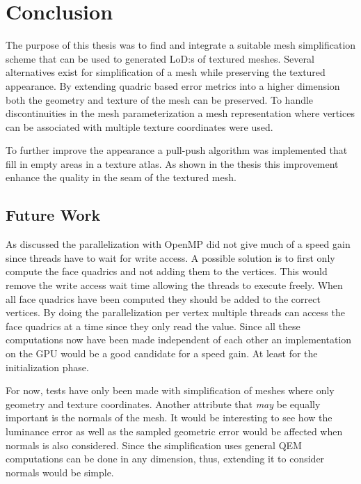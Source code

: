 \chapter{Conclusion} \label{cha:conclusion}

The purpose of this thesis was to find and integrate a suitable mesh simplification scheme that can be used to generated LoD:s of textured meshes. Several alternatives exist for simplification of a mesh while preserving the textured appearance. By extending quadric based error metrics into a higher dimension both the geometry and texture of the mesh can be preserved. To handle discontinuities in the mesh parameterization a mesh representation where vertices can be associated with multiple texture coordinates were used.

To further improve the appearance a pull-push algorithm was implemented that fill in empty areas in a texture atlas. As shown in the thesis this improvement enhance the quality in the seam of the textured mesh.

\section{Future Work}
As discussed the parallelization with OpenMP did not give much of a speed gain since threads have to wait for write access. A possible solution is to first only compute the face quadrics and not adding them to the vertices. This would remove the write access wait time allowing the threads to execute freely. When all face quadrics have been computed they should be added to the correct vertices. By doing the parallelization per vertex multiple threads can access the face quadrics at a time since they only read the value. Since all these computations now have been made independent of each other an implementation on the GPU would be a good candidate for a speed gain. At least for the initialization phase.

For now, tests have only been made with simplification of meshes where only geometry and texture coordinates. Another attribute that \emph{may} be equally important is the normals of the mesh. It would be interesting to see how the luminance error as well as the sampled geometric error would be affected when normals is also considered. Since the simplification uses general QEM computations can be done in any dimension, thus, extending it to consider normals would be simple. 
